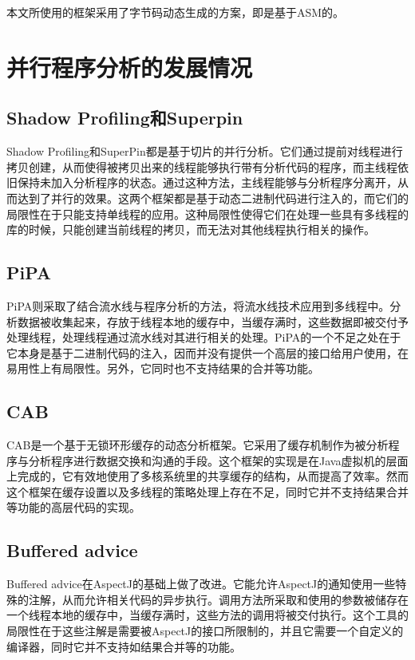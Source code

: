 本文所使用的框架采用了字节码动态生成的方案，即是基于ASM的。

\section{并行程序分析的发展情况}
\subsection{Shadow Profiling和Superpin}

Shadow Profiling\cite{shaPro}和SuperPin\cite{superPin}都是基于切片的并行分析。它们通过提前对线程进行拷贝创建，从而使得被拷贝出来的线程能够执行带有分析代码的程序，而主线程依旧保持未加入分析程序的状态。通过这种方法，主线程能够与分析程序分离开，从而达到了并行的效果。这两个框架都是基于动态二进制代码进行注入的，而它们的局限性在于只能支持单线程的应用。这种局限性使得它们在处理一些具有多线程的库的时候，只能创建当前线程的拷贝，而无法对其他线程执行相关的操作。

\subsection{PiPA}

PiPA\cite{pipa}则采取了结合流水线与程序分析的方法，将流水线技术应用到多线程中。分析数据被收集起来，存放于线程本地的缓存中，当缓存满时，这些数据即被交付予处理线程，处理线程通过流水线对其进行相关的处理。PiPA的一个不足之处在于它本身是基于二进制代码的注入，因而并没有提供一个高层的接口给用户使用，在易用性上有局限性。另外，它同时也不支持结果的合并等功能。

\subsection{CAB}

CAB\cite{CAB}是一个基于无锁环形缓存的动态分析框架。它采用了缓存机制作为被分析程序与分析程序进行数据交换和沟通的手段。这个框架的实现是在Java虚拟机的层面上完成的，它有效地使用了多核系统里的共享缓存的结构，从而提高了效率。然而这个框架在缓存设置以及多线程的策略处理上存在不足，同时它并不支持结果合并等功能的高层代码的实现。

\subsection{Buffered advice}

Buffered advice\cite{bfad}在AspectJ的基础上做了改进。它能允许AspectJ的通知使用一些特殊的注解，从而允许相关代码的异步执行。调用方法所采取和使用的参数被储存在一个线程本地的缓存中，当缓存满时，这些方法的调用将被交付执行。这个工具的局限性在于这些注解是需要被AspectJ的接口所限制的，并且它需要一个自定义的编译器，同时它并不支持如结果合并等的功能。

